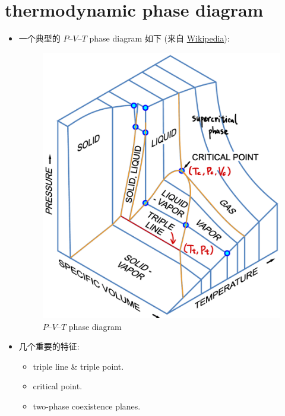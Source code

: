 \section{thermodynamic phase diagram}
\begin{itemize}
	\item 一个典型的 $P$--$V$--$T$ phase diagram 如下 (来自 \href{https://en.wikipedia.org/wiki/File:PVT_3D_diagram-en.svg}{Wikipedia}):
	
	\begin{figure}[H]
		\centering
		\includegraphics[scale=0.35]{figures/P--V--T phase diagram with comments.pdf}
		\caption{$P$--$V$--$T$ phase diagram}
	\end{figure}
	
	\item 几个重要的特征:
	\begin{itemize}
		\item triple line \& triple point.
		
		\item critical point.
		
		\item two-phase coexistence planes.
	\end{itemize}
\end{itemize}

